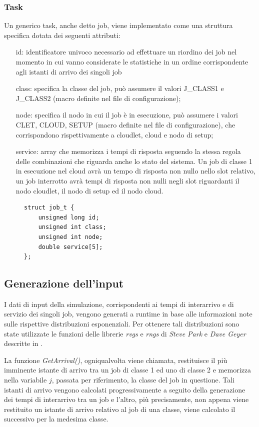 \subsubsection{Task}
Un generico task, anche detto job, viene implementato come una struttura
specifica dotata dei seguenti attributi: 
\begin{itemize}
\item[id:] identificatore univoco necessario ad effettuare un riordino dei job
nel momento in cui vanno considerate le statistiche in un ordine corrispondente
agli istanti di arrivo dei singoli job
\item[class:] specifica la classe del job, può assumere il valori J\_CLASS1 e
J\_CLASS2 (macro definite nel file di configurazione); 
\item[node:] specifica il nodo in cui il job è in esecuzione, può assumere i
valori CLET, CLOUD, SETUP (macro definite nel file di configurazione), che
corrispondono rispettivamente a cloudlet, cloud e nodo di setup; 
\item[service:] array che memorizza i tempi di risposta seguendo la stessa
regola delle combinazioni che riguarda anche lo stato del sistema. Un job di
classe 1 in esecuzione nel cloud avrà un tempo di risposta non nullo nello slot
relativo, un job interrotto avrà tempi di risposta non nulli negli slot
riguardanti il nodo cloudlet, il nodo di setup ed il nodo cloud. 
%
\end{itemize}
\begin{figure}[!h]
\begin{lstlisting}[title=basic.h]
struct job_t {
    unsigned long id;
    unsigned int class;
    unsigned int node;
    double service[5];
};
\end{lstlisting}
\end{figure}
%
%
\subsection{Generazione dell'input}
I dati di input della simulazione, corrispondenti ai tempi di interarrivo e di
servizio dei singoli job, vengono generati a runtime in base alle informazioni
note sulle rispettive distribuzioni esponenziali. Per ottenere tali
distribuzioni sono state utilizzate le funzioni delle librerie \emph{rvgs} e
\emph{rngs} di \emph{Steve Park} e \emph{Dave Geyer} descritte in \cite{leemis}.

La funzione \emph{GetArrival()}, ogniqualvolta viene chiamata, restituisce il
più imminente istante di arrivo tra un job di classe 1 ed uno di classe 2 e
memorizza nella variabile $j$, passata per riferimento, la classe del job in
questione. Tali istanti di arrivo vengono calcolati progressivamente a seguito
della generazione dei tempi di interarrivo tra un job e l’altro, più
precisamente, non appena viene restituito un istante di arrivo relativo al job
di una classe, viene calcolato il successivo per la medesima classe.

